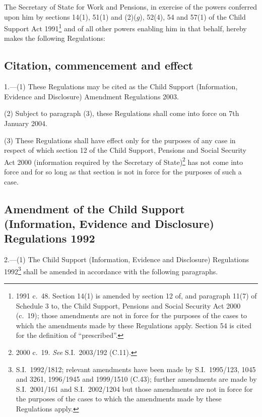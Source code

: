 \documentclass[12pt,a4paper]{article}
\title{\regstitle}
\author{S.I.\ 2003 No.\ 3206}
\date{Made
9th December 2003\\
Laid before Parliament
15th December 2003\\
Coming into force
7th January 2004
}
\begin{document}
\maketitle

\noindent
The Secretary of State for Work and Pensions, in exercise of the powers conferred upon him by sections 14(1), 51(1) and (2)($g$), 52(4), 54 and 57(1) of the Child Support Act 1991\footnote{1991 c.\ 48. Section 14(1) is amended by section 12 of, and paragraph 11(7) of Schedule 3 to, the Child Support, Pensions and Social Security Act 2000 (c.\ 19); those amendments are not in force for the purposes of the cases to which the amendments made by these Regulations apply. Section 54 is cited for the definition of “prescribed”.} and of all other powers enabling him in that behalf, hereby makes the following Regulations: 

{\sloppy

\tableofcontents

}

\bigskip

\setcounter{secnumdepth}{-2}

\subsection[1. Citation, commencement and effect]{Citation, commencement and effect}

1.---(1)  These Regulations may be cited as the Child Support (Information, Evidence and Disclosure) Amendment Regulations 2003.

(2) Subject to paragraph (3), these Regulations shall come into force on 7th January 2004.

(3) These Regulations shall have effect only for the purposes of any case in respect of which section 12 of the Child Support, Pensions and Social Security Act 2000 (information required by the Secretary of State)\footnote{2000 c.\ 19. \emph{See} S.I.\ 2003/192 (C.11).} has not come into force and for so long as that section is not in force for the purposes of such a case.

\subsection[2. Amendment of the Child Support (Information, Evidence and Disclosure) Regulations 1992]{Amendment of the Child Support (Information, Evidence and Disclosure) Regulations 1992}

2.---(1)  The Child Support (Information, Evidence and Disclosure) Regulations 1992\footnote{S.I.\ 1992/1812; relevant amendments have been made by S.I.\ 1995/123, 1045 and 3261, 1996/1945 and 1999/1510 (C.43); further amendments are made by S.I.\ 2001/161 and S.I.\ 2002/1204 but those amendments are not in force for the purposes of the cases to which the amendments made by these Regulations apply.} shall be amended in accordance with the following paragraphs.
\end{document}
